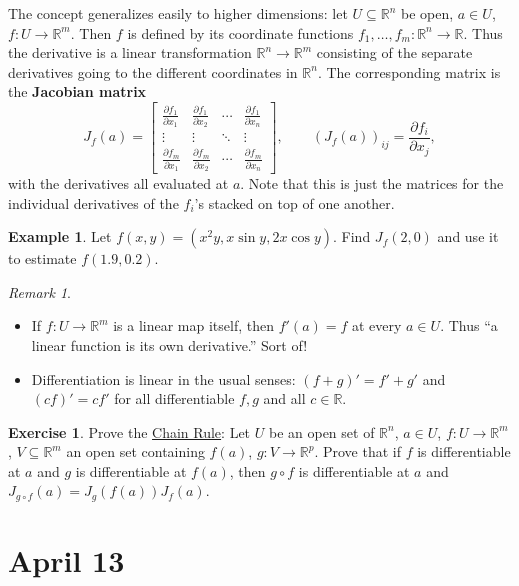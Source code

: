 \documentclass[12pt]{article}
\newcommand{\real}{\mathbb{R}}
\theoremstyle{definition}
\newtheorem{example}[theorem]{Example}
\newtheorem{exercise}{Exercise}
\theoremstyle{remark}
\newtheorem*{remark}{Remark}
\begin{document}
The concept generalizes easily to higher dimensions: let $U \subseteq \real^n$ be open, $a \in U$, $f : U \to \real^m$. Then $f$ is defined by its coordinate functions $f_1 , \dotsc , f_m : \real^n \to \real$. Thus the derivative is a linear transformation $\real^n \to \real^m$ consisting of the separate derivatives going to the different coordinates in $\real^n$. The corresponding matrix is the \textbf{Jacobian matrix}
\begin{equation}
    J_f(a) = 
    \begin{bmatrix}
        \frac{\partial f_1}{\partial x_1} & \frac{\partial f_1}{\partial x_2} & \cdots & \frac{\partial f_1}{\partial x_n} \\
        \vdots & \vdots & \ddots & \vdots \\
        \frac{\partial f_m}{\partial x_1} & \frac{\partial f_m}{\partial x_2} & \cdots & \frac{\partial f_m}{\partial x_n}
    \end{bmatrix}, 
    \qquad
    \left( J_f(a) \right)_{ij} = \frac{\partial f_i}{\partial x_j},
\end{equation}
with the derivatives all evaluated at $a$. Note that this is just the matrices for the individual derivatives of the $f_i$'s stacked on top of one another.
\begin{example}
    Let $f(x,y) = (x^2y, x \sin y , 2x \cos y)$. Find $J_f(2,0)$ and use it to estimate $f(1.9,0.2)$.
\end{example}
\begin{remark}
    \noindent
    \begin{itemize}
        \item If $f : U \to \real^m$ is a linear map itself, then $f'(a) = f$ at every $a \in U$. Thus ``a linear function is its own derivative.'' Sort of!
        \item Differentiation is linear in the usual senses: $(f + g)' = f' + g'$ and $(cf)' = cf'$ for all differentiable $f , g$ and all $c \in \real$.
    \end{itemize}
\end{remark}
\begin{exercise}
    Prove the \underline{Chain Rule}: Let $U$ be an open set of $\real^n$, $a \in U$, $f : U \to \real^m$, $V \subseteq \real^m$ an open set containing $f(a)$, $g : V \to \real^p$. Prove that if $f$ is differentiable at $a$ and $g$ is differentiable at $f(a)$, then $g \circ f$ is differentiable at $a$ and $J_{g \circ f}(a) = J_g \left( f(a) \right) J_f(a)$.
\end{exercise}
\section{April 13}
\end{document}
